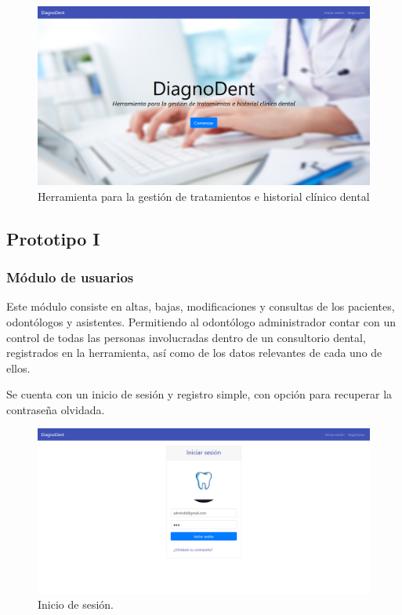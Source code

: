 \begin{figure}[H]
\centering
\includegraphics[width=17cm, keepaspectratio]{pictures/inicio.png}
\caption{Herramienta para la gestión de tratamientos e historial clínico dental}
\end{figure}











\subsection{Prototipo I}
\subsubsection{Módulo de usuarios}
Este módulo consiste en altas, bajas, modificaciones y consultas de los pacientes, odontólogos y asistentes. Permitiendo al odontólogo administrador contar con un control de todas las personas involucradas dentro de un consultorio dental, registrados en la herramienta, así como de los datos relevantes de cada uno de ellos.

\vspace{1em}

Se cuenta con un inicio de sesión y registro simple, con opción para recuperar la contraseña olvidada.

\begin{figure}[H]
\centering
\includegraphics[width=17cm,keepaspectratio]{pictures/adminodo/login/inicio-1.png}
\caption{Inicio de sesión.}
\end{figure}


